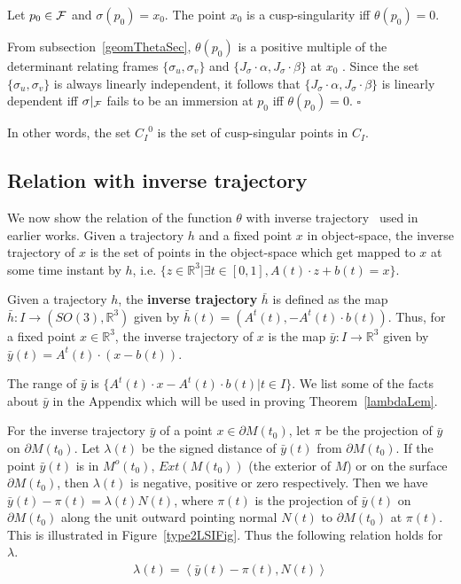\documentclass{elsart5p}
\begin{document}
\begin{lem} \label{singLem}
Let $p_0 \in {\cal F}$ and $\sigma(p_0) = x_0$. The point  $x_0$ is a 
cusp-singularity iff $\theta(p_0) = 0$.
\end{lem}
  From subsection~\ref{geomThetaSec}, $\theta(p_0)$ is a positive multiple of 
the determinant relating frames $\{ \sigma_u, \sigma_v \}$ and 
$\{ J_{\sigma} \cdot \alpha, J_{\sigma} \cdot \beta \}$ at $x_0$ .  Since the set $\{ \sigma_u, \sigma_v \}$ 
is always linearly independent, it follows that $\{ J_{\sigma} \cdot \alpha, J_{\sigma} \cdot \beta \}$ is linearly 
dependent iff $\sigma|_{{\cal F}}$ fails to be an immersion at $p_0$ iff $\theta(p_0) = 0$.
\hfill $\square$

In other words, the set ${C_I}^0$ is the set of cusp-singular points in $C_I$.

\subsection{Relation with inverse trajectory}  \label{inverseTrajSec}

We now show the relation of the function $\theta$ with inverse 
trajectory~\cite{trimming, classifyPoints} used in earlier works.
Given a trajectory $h$ and a fixed point $x$ in object-space, 
the inverse trajectory of $x$ is
the set of points in the object-space which get mapped to $x$ at some time instant by $h$, i.e. 
$\{ z \in \mathbb{R}^3 | \exists t \in [0,1], A(t) \cdot z + b(t) = x\}$.  

\begin{defn} \label{invTrajDef}
Given a trajectory $h$, the {\bf inverse trajectory} $\bar{h}$ is defined as the map $\bar{h}:I  \to (SO(3), \mathbb{R}^3)$ given by $\bar{h}(t) = (A^t(t), -A^t(t) \cdot b(t))$.  
Thus, for a fixed point $x \in \mathbb{R}^3$, the inverse trajectory of $x$ is the map $\bar{y}:I \to \mathbb{R}^3$ 
given by $\bar{y}(t) = A^t(t) \cdot (x - b(t))$. 
\end{defn}
The range of $\bar{y}$ is $\{ A^t(t) \cdot x - A^t(t) \cdot b(t) | t \in I \} $.  We list some of the facts about 
$\bar{y}$ in the Appendix  which will be used in proving Theorem~\ref{lambdaLem}.

For the inverse trajectory $\bar{y}$ of a point $x \in \partial M(t_0)$, let $\pi$ be 
the projection of $\bar{y}$ on $\partial M(t_0)$.  Let $\lambda(t)$ be the signed distance 
of $\bar{y}(t)$ from $\partial M(t_0)$. If the point $\bar{y}(t)$ is in $M^o(t_0)$, $Ext(M(t_0))$ 
(the exterior of $M$) or on the surface $\partial M(t_0)$, then $\lambda(t)$ is negative, positive 
or zero respectively.  Then we have $\bar{y}(t) - \pi(t) = \lambda(t)N(t)$, where $\pi(t)$ is the 
projection of $\bar{y}(t)$ on $\partial M(t_0)$ along the unit outward pointing normal 
$N(t)$ to $\partial M(t_0)$ at $\pi(t)$.  This is illustrated in Figure~\ref{type2LSIFig}.
Thus the following relation holds for $\lambda$.
\begin{align} \label{lambdaEq}
\lambda(t) = \left < \bar{y}(t) - \pi(t) , N(t) \right >
\end{align}
\end{document}
